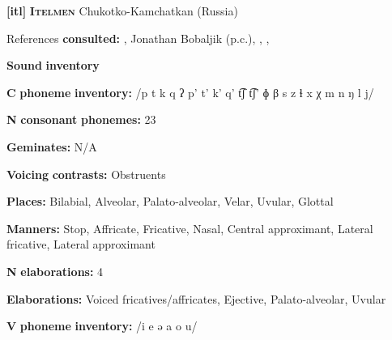 \documentclass[output=paper]{langsci/langscibook}
\begin{document}
\begin{styleBody}
\textbf{[itl]}   \textbf{\textsc{Itelmen}}  Chukotko-Kamchatkan (Russia)
\end{styleBody}

\begin{styleBody}
References \textbf{consulted:} \citet{Bobaljik2006}, Jonathan Bobaljik (p.c.), \citet{GeorgVolodin1999}, \citet{Volodin1976}, \citet{VolodinZhukova1968}
\end{styleBody}

\begin{styleBody}
\textbf{Sound} \textbf{inventory}
\end{styleBody}

\begin{styleBody}
\textbf{C} \textbf{phoneme} \textbf{inventory:} /p t k q ʔ p’ t’ k’ q’ t͡ʃ t͡ʃ’ ɸ β s z ɬ x χ m n ŋ l j/
\end{styleBody}

\begin{styleBody}
\textbf{N} \textbf{consonant} \textbf{phonemes:} 23
\end{styleBody}

\begin{styleBody}
\textbf{Geminates:} N/A
\end{styleBody}

\begin{styleBody}
\textbf{Voicing} \textbf{contrasts:} Obstruents
\end{styleBody}

\begin{styleBody}
\textbf{Places:} Bilabial, Alveolar, Palato-alveolar, Velar, Uvular, Glottal
\end{styleBody}

\begin{styleBody}
\textbf{Manners:} Stop, Affricate, Fricative, Nasal, Central approximant, Lateral fricative, Lateral approximant
\end{styleBody}

\begin{styleBody}
\textbf{N} \textbf{elaborations:} 4
\end{styleBody}

\begin{styleBody}
\textbf{Elaborations:} Voiced fricatives/affricates, Ejective, Palato-alveolar, Uvular
\end{styleBody}

\begin{styleBody}
\textbf{V} \textbf{phoneme} \textbf{inventory:} /i e ə a o u/
\end{styleBody}
\end{document}
